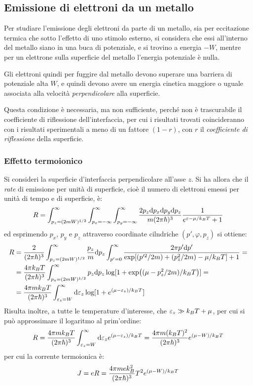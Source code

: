 \subsection{Emissione di elettroni da un metallo}

Per studiare l'emissione degli elettroni da parte di un metallo, sia per eccitazione termica che sotto l'effetto di uno stimolo esterno, si considera che essi all'interno del metallo siano in una buca di potenziale, e si trovino a energia $ - W $, mentre per un elettrone sulla superficie del metallo l'energia potenziale è nulla.

Gli elettroni quindi per fuggire dal metallo devono superare una barriera di potenziale alta $ W $, e quindi devono avere un energia cinetica maggiore o uguale associata alla velocità \textit{perpendicolare} alla superficie.

Questa condizione è necessaria, ma non sufficiente, perché non è trascurabile il coefficiente di riflessione dell'interfaccia, per cui i risultati trovati coincideranno con i risultati sperimentali a meno di un fattore $ (1 - r) $, con $ r $ il \textit{coefficiente di riflessione} della superficie.

\subsubsection{Effetto termoionico}

Si consideri la superficie d'interfaccia perpendicolare all'asse $ z $. Si ha allora che il \textit{rate} di emissione per unità di superficie, cioè il numero di elettroni emessi per unità di tempo e di superficie, è:
\[ R = \int_{p_z = (2mW)^{1/2}}^{\infty}\int_{p_x = -\infty}^{\infty} \int_{p_y = -\infty}^{\infty} \frac{2p_z \dd p_x \dd p_y \dd p_z}{m (2\pi \hbar)^3}\frac{1}{e^{\varepsilon - \mu / k_B T} + 1} \]
ed esprimendo $ p_x $, $ p_y $ e $ p_z $ attraverso coordinate cilndriche $ (p', \varphi, p_z) $ si ottiene:
\begin{align*}
R &= \frac{2}{(2\pi \hbar)^3}\int_{p_z = (2mW)^{1/2}}^{\infty} \frac{p_z}{m} \dd p_z \int_{p' = 0}^{\infty} \frac{2\pi p' \dd p'}{\exp[(p'^2/2m) + (p_z^2/2m) - \mu / k_B T] + 1} =\\
&= \frac{4\pi k_B T}{(2\pi \hbar)^3} \int_{p_z = (2mW)^{1/2}}^{\infty} p_z \dd p_z \log[1 + \exp((\mu - p_z^2/2m)/k_B T)]=\\
&= \frac{4\pi m k_B T}{(2\pi \hbar)^3} \int_{\varepsilon_z = W}^{\infty} \dd \varepsilon_z \log[1 + e^{(\mu - \varepsilon_z)/k_B T}]
\end{align*}
Risulta inoltre, a tutte le temperature d'interesse, che $ \varepsilon_z \gg k_B T + \mu $, per cui si può approssimare il logaritmo al prim'ordine:
\[ R = \frac{4\pi m k_B T}{(2\pi \hbar)^3} \int_{\varepsilon_z = W}^{\infty} \dd \varepsilon_z e^{(\mu - \varepsilon_z)/k_B T} = \frac{4\pi m (k_B T)^2}{(2\pi \hbar)^3} e^{(\mu - W)/k_B T} \]
per cui la corrente termoionica è:
\[ J = e R =  \frac{4\pi m e k_B^2}{(2\pi \hbar)^3} T^2 e^{(\mu - W)/k_B T} \]

